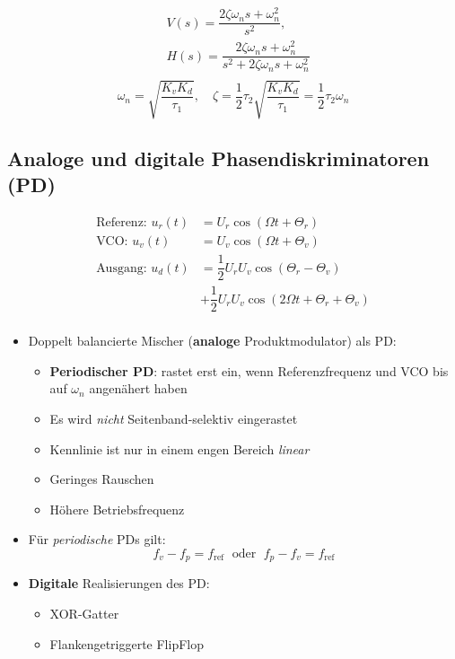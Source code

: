 \begin{align*}
    &V(s) = \dfrac{2\zeta\omega_n s + \omega_n^2}{s^2},\\
    &H(s) = \dfrac{2\zeta\omega_n s + \omega_n^2}{s^2 + 2\zeta\omega_n s + \omega_n^2}\\
\end{align*}
\begin{equation*}
    \omega_n = \sqrt{\dfrac{K_v K_d}{\tau_1}}, \quad \zeta = \dfrac{1}{2}\tau_2\sqrt{\dfrac{K_v K_d}{\tau_1}} = \dfrac{1}{2}\tau_2 \omega_n
\end{equation*}

\subsection{Analoge und digitale Phasendiskriminatoren (PD)}
\begin{align*}
    \text{Referenz: } u_r(t) &= U_r \cos(\Omega t + \Theta_r)\\
    \text{VCO: } u_v(t) &= U_v \cos(\Omega t + \Theta_v)\\
    \text{Ausgang: } u_d(t) &= \dfrac{1}{2} U_r U_v  \cos(\Theta_r - \Theta_v)\\
        &+ \dfrac{1}{2} U_r U_v \cos(2\Omega t + \Theta_r + \Theta_v)\\
\end{align*}
\begin{itemize}
    \itemsep0pt
    \item Doppelt balancierte Mischer (\textbf{analoge} Produktmodulator) als PD:
        \begin{itemize}
            \itemsep0pt
            \item \textbf{Periodischer PD}: rastet erst ein, wenn Referenzfrequenz und VCO bis auf $\omega_n$ angenähert haben
            \item Es wird \textit{nicht} Seitenband-selektiv eingerastet
            \item Kennlinie ist nur in einem engen Bereich \textit{linear}
            \item Geringes Rauschen
            \item Höhere Betriebsfrequenz
        \end{itemize}
        \item Für \textit{periodische} PDs gilt:
            \begin{equation*}
                f_v - f_p = f_{\mathrm{ref}}\; \text{ oder }\; f_p - f_v = f_{\mathrm{ref}}
            \end{equation*}
        \item \textbf{Digitale} Realisierungen des PD:
            \begin{itemize}
                \itemsep0pt
                \item XOR-Gatter
                \item Flankengetriggerte FlipFlop
            \end{itemize}
\end{itemize}

